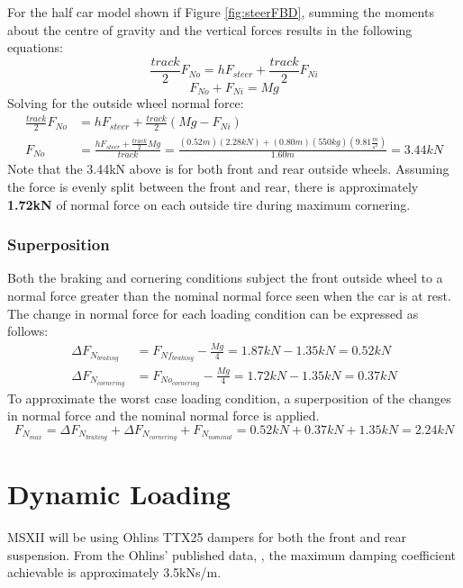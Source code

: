 \documentclass[12pt]{article}
\begin{document}
\noindent For the half car model shown if Figure \ref{fig:steerFBD}, summing the moments about the centre of gravity and the vertical forces results in the following equations: 
\begin{equation}
	\frac{track}{2}F_{No} = hF_{steer} + \frac{track}{2}F_{Ni}
\end{equation}
\begin{equation}
	F_{No} + F_{Ni} = Mg
\end{equation}
Solving for the outside wheel normal force: 
\begin{equation}
\begin{split}
	\frac{track}{2}F_{No} &= hF_{steer} + \frac{track}{2}(Mg - F_{Ni})\\
	F_{No} &= \frac{hF_{steer} + \frac{track}{2}Mg}{track} = \frac{(0.52m)(2.28kN)+(0.80m)(550kg)\left(9.81\frac{m}{s^2}\right)}{1.60m} = 3.44kN
\end{split}
\end{equation}
Note that the 3.44kN above is for both front and rear outside wheels. Assuming the force is evenly split between the front and rear, there is approximately \textbf{1.72kN} of normal force on each outside tire during maximum cornering. 
\subsubsection{Superposition}
Both the braking and cornering conditions subject the front outside wheel to a normal force greater than the nominal normal force seen when the car is at rest. The change in normal force for each loading condition can be expressed as follows: 
\begin{equation}
	\begin{split}
		\Delta F_{N_{braking}} &= F_{Nf_{braking}} - \frac{Mg}{4} =  1.87kN - 1.35kN = 0.52kN\\
		\Delta F_{N_{cornering}} &=  F_{No_{cornering}} - \frac{Mg}{4} =  1.72kN - 1.35kN = 0.37kN
	\end{split}
\end{equation}
To approximate the worst case loading condition, a superposition of the changes in normal force and the nominal normal force is applied. 
\begin{equation}
	F_{N_{max}} = \Delta F_{N_{braking}} + \Delta F_{N_{cornering}} + F_{N_{nominal}} = 0.52kN + 0.37kN + 1.35kN = 2.24kN
\end{equation}

\section{Dynamic Loading}
MSXII will be using Ohlins TTX25 dampers for both the front and rear suspension. From the Ohlins' published data, \cite{tbd}, the maximum damping coefficient achievable is approximately 3.5kNs/m. 
\end{document}
